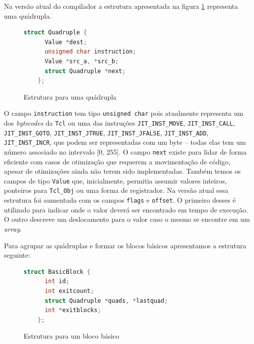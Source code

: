 Na versão atual do compilador a estrutura apresentada na figura
\ref{quad-struct} representa uma quádrupla.

\begin{figure}[h]
  \centering
  \begin{lstlisting}[language=C]
    struct Quadruple {
      Value *dest;
      unsigned char instruction;
      Value *src_a, *src_b;
      struct Quadruple *next;
    };
  \end{lstlisting}
  \caption{Estrutura para uma quádrupla\label{quad-struct}}
\end{figure}

O campo \verb!instruction! tem tipo \verb!unsigned char! pois atualmente
representa um dos \textit{bytecodes} da \texttt{Tcl} ou uma das
instruções \verb!JIT_INST_MOVE!, \verb!JIT_INST_CALL!,\\
\verb!JIT_INST_GOTO!, \verb!JIT_INST_JTRUE!, \verb!JIT_INST_JFALSE!,
\verb!JIT_INST_ADD!,\\ \verb!JIT_INST_INCR!, que podem ser representadas com um
byte -- todas elas tem um número associado no intervalo [0, 255].
O campo \verb!next! existe para
lidar de forma eficiente com casos de otimização que requerem a
movimentação de código, apesar de otimizações ainda não terem sido
implementadas. Também temos os campos de tipo \verb!Value! que,
inicialmente, permitia assumir valores inteiros, ponteiros para
\verb!Tcl_Obj! ou uma forma de registrador. Na versão atual essa
estrutura foi aumentada com os campos \verb!flags! e \verb!offset!. O
primeiro desses é utilizado para indicar onde o valor deverá
ser encontrado em tempo de execução. O outro descreve um deslocamento
para o valor caso o mesmo se encontre em um \textit{array}.

Para agrupar as quádruplas e formar os blocos básicos apresentamos a
estrutura seguinte:

\begin{figure}[h]
  \centering
  \begin{lstlisting}[language=C]
    struct BasicBlock {
      int id;
      int exitcount;
      struct Quadruple *quads, *lastquad;
      int *exitblocks;
    };
  \end{lstlisting}
  \caption{Estrutura para um bloco básico}
\end{figure}

